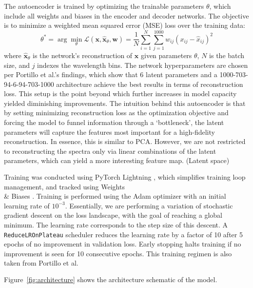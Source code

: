 \documentclass[11pt]{article}
\begin{document}
The autoencoder is trained by optimizing the trainable parameters $\theta$, which include all weights and biases in the encoder and decoder networks. The objective is to minimize a weighted mean squared error (MSE) loss over the training data:
\begin{equation}
\theta^* = \arg\min_\theta \mathcal{L}(\mathbf{x}, \hat{\mathbf{x}}_\theta, \mathbf{w}) = \frac{1}{N} \sum_{i=1}^{N} \sum_{j=1}^{1000} w_{ij} (x_{ij} - \hat{x}_{ij})^2
\end{equation}
where $\hat{\mathbf{x}}_\theta$ is the network’s reconstruction of $\mathbf{x}$ given parameters $\theta$, $N$ is the batch size, and $j$ indexes the wavelength bins. The network hyperparameters are chosen per Portillo et al.'s findings, which show that 6 latent parameters and a 1000-703-94-6-94-703-1000 architecture achieve the best results in terms of reconstruction loss. This setup is the point beyond which further increases in model capacity yielded diminishing improvements. The intuition behind this autoencoder is that by setting minimizing reconstruction loss as the optimization objective and forcing the model to funnel information through a `bottleneck', the latent parameters will capture the features most important for a high-fidelity reconstruction. In essence, this is similar to PCA. However, we are not restricted to reconstructing the spectra only via linear combinations of the latent parameters, which can yield a more interesting feature map. (Latent space)

Training was conducted using PyTorch Lightning \citep{Falcon2019}, which simplifies training loop management, and tracked using Weights \\& Biases \citep{Biewald2020}. Training is performed using the Adam optimizer \citep{adam} with an initial learning rate of $10^{-3}$. Essentially, we are performing a variation of stochastic gradient descent on the loss landscape, with the goal of reaching a global minimum. The learning rate corresponds to the step size of this descent. A \texttt{ReduceLROnPlateau} scheduler reduces the learning rate by a factor of 10 after 5 epochs of no improvement in validation loss. Early stopping halts training if no improvement is seen for 10 consecutive epochs. This training regimen is also taken from Portillo et al.

Figure~\ref{fig:architecture} shows the architecture schematic of the model.
\end{document}
